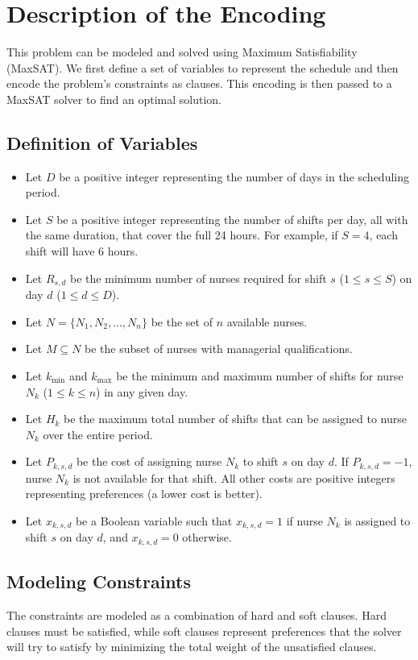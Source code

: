 \documentclass[sigconf, 10pt]{acmart}
\begin{document}
\section{Description of the Encoding}
This problem can be modeled and solved using Maximum Satisfiability (MaxSAT). We first define a set of variables to represent the schedule and then encode the problem's constraints as clauses. This encoding is then passed to a MaxSAT solver to find an optimal solution.

\subsection{Definition of Variables}
\begin{itemize}
    \item Let $D$ be a positive integer representing the number of days in the scheduling period.
    \item Let $S$ be a positive integer representing the number of shifts per day, all with the same duration, that cover the full 24 hours. For example, if $S = 4$, each shift will have 6 hours.
    \item Let $R_{s,d}$ be the minimum number of nurses required for shift $s$ ($1 \le s \le S$) on day $d$ ($1 \le d \le D$).
    \item Let $N = \{N_1, N_2, \dots, N_n\}$ be the set of $n$ available nurses.
    \item Let $M \subseteq N$ be the subset of nurses with managerial qualifications.
    \item Let $k_{\min}$ and $k_{\max}$ be the minimum and maximum number of shifts for nurse $N_k$ ($1 \le k \le n$) in any given day.
    \item Let $H_k$ be the maximum total number of shifts that can be assigned to nurse $N_k$ over the entire period.
    \item Let $P_{k,s,d}$ be the cost of assigning nurse $N_k$ to shift $s$ on day $d$. If $P_{k,s,d} = -1$, nurse $N_k$ is not available for that shift. All other costs are positive integers representing preferences (a lower cost is better).
    \item Let $x_{k,s,d}$ be a Boolean variable such that $x_{k,s,d} = 1$ if nurse $N_k$ is assigned to shift $s$ on day $d$, and $x_{k,s,d} = 0$ otherwise.
\end{itemize}

\subsection{Modeling Constraints}
The constraints are modeled as a combination of hard and soft clauses. Hard clauses must be satisfied, while soft clauses represent preferences that the solver will try to satisfy by minimizing the total weight of the unsatisfied clauses.
\end{document}
